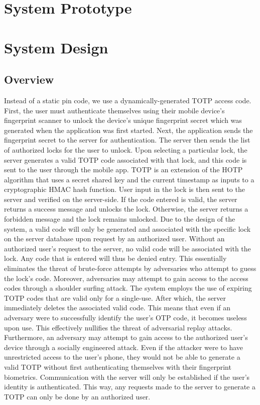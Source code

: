 \documentclass[conference]{IEEEtran}
\begin{document}
\section{System Prototype}
\section{System Design}
\subsection{Overview}
	Instead of a static pin code, we use a dynamically-generated TOTP access code. First, the user must authenticate themselves using their mobile device’s fingerprint scanner to unlock the device’s unique fingerprint secret which was generated when the application was first started. Next, the application sends the fingerprint secret to the server for authentication. The server then sends the list of authorized locks for the user to unlock. Upon selecting a particular lock, the server generates a valid TOTP code associated with that lock, and this code is sent to the user through the mobile app. TOTP is an extension of the HOTP algorithm that uses a secret shared key and the current timestamp as inputs to a cryptographic HMAC hash function. User input in the lock is then sent to the server and verified on the server-side. If the code entered is valid, the server returns a success message and unlocks the lock. Otherwise, the server returns a forbidden message and the lock remains unlocked.
	Due to the design of the system, a valid code will only be generated and associated with the specific lock on the server database upon request by an authorized user. Without an authorized user’s request to the server, no valid code will be associated with the lock. Any code that is entered will thus be denied entry. This essentially eliminates the threat of brute-force attempts by adversaries who attempt to guess the lock’s code. 
Moreover, adversaries may attempt to gain access to the access codes through a shoulder surfing attack. The system employs the use of expiring TOTP codes that are valid only for a single-use. After which, the server immediately deletes the associated valid code. This means that even if an adversary were to successfully identify the user’s OTP code, it becomes useless upon use. This effectively nullifies the threat of adversarial replay attacks.
	Furthermore, an adversary may attempt to gain access to the authorized user’s device through a socially engineered attack. Even if the attacker were to have unrestricted access to the user’s phone, they would not be able to generate a valid TOTP without first authenticating themselves with their fingerprint biometrics. Communication with the server will only be established if the user’s identity is authenticated. This way, any requests made to the server to generate a TOTP can only be done by an authorized user.
\end{document}
